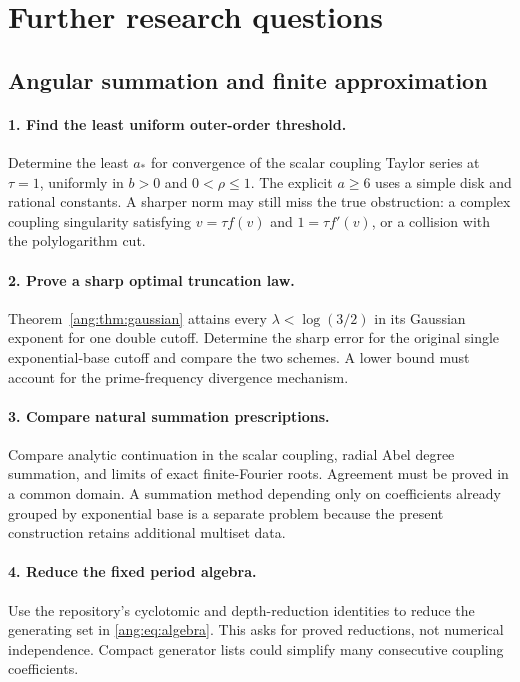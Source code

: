 \section{Further research questions}
\label{sec:future}

\subsection{Angular summation and finite approximation}

\paragraph{1. Find the least uniform outer-order threshold.}
Determine the least $a_*$ for convergence of the scalar coupling
Taylor series at $\tau=1$, uniformly in $b>0$ and $0<\rho\le1$.
The explicit $a\ge6$ uses a simple disk and rational constants.
A sharper norm may still miss the true obstruction: a complex
coupling singularity satisfying $v=\tau f(v)$ and
$1=\tau f'(v)$, or a collision with the polylogarithm cut.

\paragraph{2. Prove a sharp optimal truncation law.}
Theorem~\ref{ang:thm:gaussian} attains every
$\lambda<\log(3/2)$ in its Gaussian exponent for one double
cutoff. Determine the sharp error for the original single
exponential-base cutoff and compare the two schemes. A lower bound
must account for the prime-frequency divergence mechanism.

\paragraph{3. Compare natural summation prescriptions.}
Compare analytic continuation in the scalar coupling, radial Abel
degree summation, and limits of exact finite-Fourier roots.
Agreement must be proved in a common domain. A summation method
depending only on coefficients already grouped by exponential base
is a separate problem because the present construction retains
additional multiset data.

\paragraph{4. Reduce the fixed period algebra.}
Use the repository's cyclotomic and depth-reduction identities to
reduce the generating set in \eqref{ang:eq:algebra}. This asks for
proved reductions, not numerical independence. Compact generator
lists could simplify many consecutive coupling coefficients.

